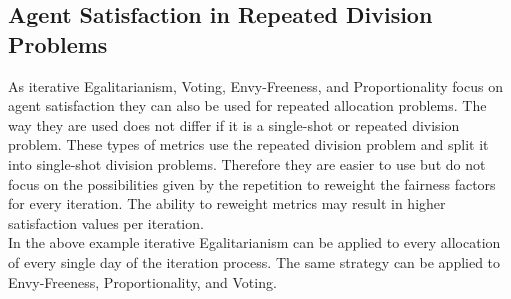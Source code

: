 \documentclass[german, a4paper, 11pt, oneside]{scrbook}
\begin{document}
\subsection{Agent Satisfaction in Repeated Division Problems}
As iterative Egalitarianism, Voting, Envy-Freeness, and Proportionality focus on agent satisfaction they can also be used for repeated allocation problems. The way they are used does not differ if it is a single-shot or repeated division problem. These types of metrics use the repeated division problem and split it into single-shot division problems. Therefore they are easier to use but do not focus on the possibilities given by the repetition to reweight the fairness factors for every iteration. The ability to reweight metrics may result in higher satisfaction values per iteration.
\\In the above example iterative Egalitarianism can be applied to every allocation of every single day of the iteration process. The same strategy can be applied to Envy-Freeness, Proportionality, and Voting. 
\end{document}
